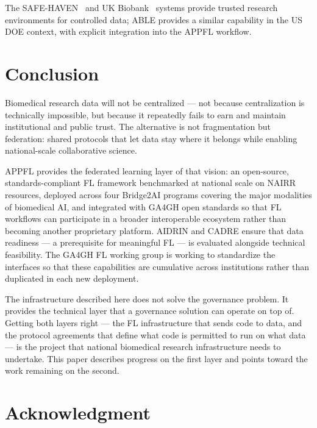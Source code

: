 \documentclass[conference]{IEEEtran}
\begin{document}
The SAFE-HAVEN~\cite{safe2019} and UK Biobank~\cite{bycroft2018} systems provide trusted research environments for controlled data; ABLE provides a similar capability in the US DOE context, with explicit integration into the APPFL workflow.

\section{Conclusion}

Biomedical research data will not be centralized — not because centralization is technically impossible, but because it repeatedly fails to earn and maintain institutional and public trust. The alternative is not fragmentation but federation: shared protocols that let data stay where it belongs while enabling national-scale collaborative science.

APPFL provides the federated learning layer of that vision: an open-source, standards-compliant FL framework benchmarked at national scale on NAIRR resources, deployed across four Bridge2AI programs covering the major modalities of biomedical AI, and integrated with GA4GH open standards so that FL workflows can participate in a broader interoperable ecosystem rather than becoming another proprietary platform. AIDRIN and CADRE ensure that data readiness — a prerequisite for meaningful FL — is evaluated alongside technical feasibility. The GA4GH FL working group is working to standardize the interfaces so that these capabilities are cumulative across institutions rather than duplicated in each new deployment.

The infrastructure described here does not solve the governance problem. It provides the technical layer that a governance solution can operate on top of. Getting both layers right — the FL infrastructure that sends code to data, and the protocol agreements that define what code is permitted to run on what data — is the project that national biomedical research infrastructure needs to undertake. This paper describes progress on the first layer and points toward the work remaining on the second.

\section*{Acknowledgment}
\end{document}

